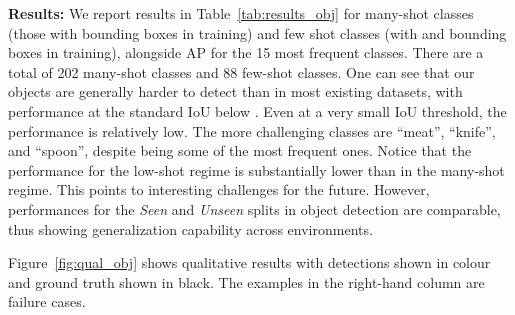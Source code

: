 \documentclass[runningheads]{llncs}
\begin{document}
\noindent\textbf{Results:} We report results in Table~\ref{tab:results_obj} for many-shot classes (those with  bounding boxes in training) and few shot classes (with  and  bounding boxes in training), alongside AP for the 15 most frequent classes. There are a total of 202 many-shot classes and 88 few-shot classes. One can see that our objects are generally harder to detect than in most existing datasets, with performance at the standard IoU  below . Even at a very small IoU threshold, the performance is relatively low. The more challenging classes are ``meat'', ``knife'', and ``spoon'', despite being some of the most frequent ones. Notice that the performance for the low-shot regime is substantially lower than in the many-shot regime. This points to interesting challenges for the future. However, performances for the \emph{Seen} and \emph{Unseen} splits in object detection are comparable, thus showing generalization capability across environments. 

Figure~\ref{fig:qual_obj} shows qualitative results  with detections shown in colour and ground truth shown in black. The examples in the right-hand column are failure cases.

\begin{table}[t!]
\vspace{-2.0mm}
\centering
\caption{Baseline results for the Object Detection challenge}
\label{tab:results_obj}
\end{table}
\end{document}
